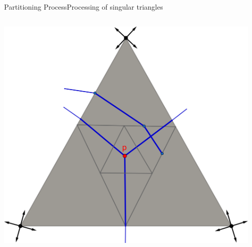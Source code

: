 \documentclass[compress,10pt,aspectratio=169]{beamer}
\begin{document}
\begin{frame}{Partitioning Process}{Processing of singular triangles}
\begin{columns}
\begin{column}{0.7\textwidth}
{\includegraphics[scale=0.106]{images/draw_streams_sing_3.pdf}
}
\vspace{0.35cm}
\end{column}
\begin{column}{0.7\textwidth}
\centering
{}
\end{column}
\end{columns}
\end{frame}
\end{document}
